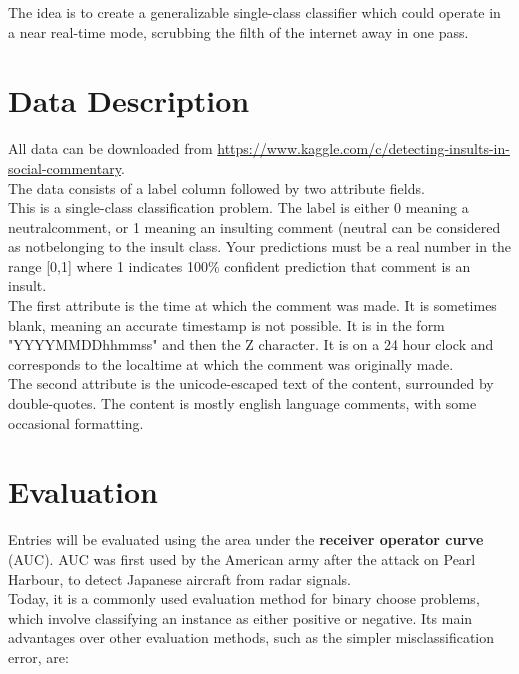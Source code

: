\documentclass[11pt]{article}
\begin{document}
\begin{singlespacing}
The idea is to create a generalizable single-class classifier which could operate in a near real-time mode, scrubbing the filth of the internet away in one pass.

\section{Data Description} %
All data can be downloaded from \url{https://www.kaggle.com/c/detecting-insults-in-social-commentary}.\\
The data consists of a label column followed by two attribute fields. \\

This is a single-class classification problem. The label is either 0 meaning a neutralcomment, or 1 meaning an insulting comment (neutral can be considered as notbelonging to the insult class.  Your predictions must be a real number in the range [0,1] where 1 indicates 100\% confident prediction that comment is an insult.\\

The first attribute is the time at which the comment was made. It is sometimes blank, meaning an accurate timestamp is not possible. It is in the form "YYYYMMDDhhmmss" and then the Z character. It is on a 24 hour clock and corresponds to the localtime at which the comment was originally made.\\

The second attribute is the unicode-escaped text of the content, surrounded by double-quotes. The content is mostly english language comments, with some occasional formatting. 


\section{Evaluation}
Entries will be evaluated using the area under the \textbf{receiver operator curve} (AUC). AUC was first used by the American army after the attack on Pearl Harbour, to detect Japanese aircraft from radar signals.\\

Today, it is a commonly used evaluation method for binary choose problems, which involve classifying an instance as either positive or negative. Its main advantages over other evaluation methods, such as the simpler misclassification error, are:  \\


\end{singlespacing}
\end{document}
